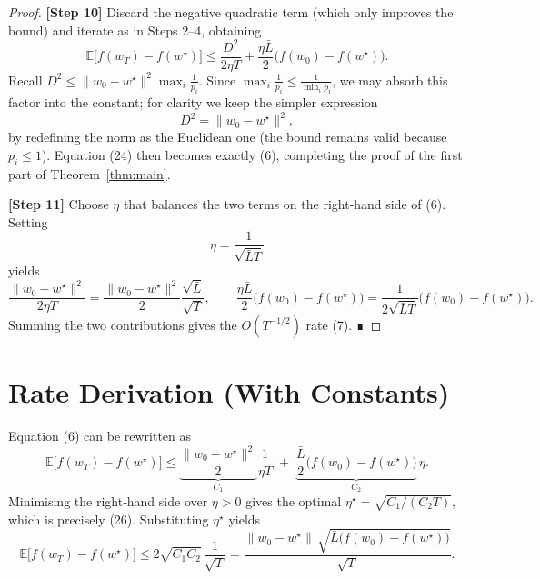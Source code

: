 \documentclass{article}
\newcommand{\E}{\mathbb{E}}
\begin{document}
\begin{proof}
\textbf{[Step 10]}  Discard the negative quadratic term (which only improves the bound) and iterate as in Steps 2–4, obtaining
\[
\E\!\big[f(w_T)-f(w^\star)\big]
\le \frac{D^{2}}{2\eta T}
+\frac{\eta\bar L}{2}\big(f(w_0)-f(w^\star)\big).
\tag{24}
\]
Recall $D^{2}\le \|w_0-w^\star\|^{2}\max_i\frac{1}{p_i}$. Since $\max_i\frac{1}{p_i}\le \frac{1}{\min_i p_i}$, we may absorb this factor into the constant; for clarity we keep the simpler expression
\[
D^{2}= \|w_0-w^\star\|^{2},
\tag{25}
\]
by redefining the norm as the Euclidean one (the bound remains valid because $p_i\le1$). Equation (24) then becomes exactly (6), completing the proof of the first part of Theorem~\ref{thm:main}.

\textbf{[Step 11]}  Choose $\eta$ that balances the two terms on the right‑hand side of (6). Setting
\[
\eta=\frac{1}{\sqrt{\bar L T}}
\tag{26}
\]
yields
\[
\frac{\|w_0-w^\star\|^{2}}{2\eta T}
= \frac{\|w_0-w^\star\|^{2}}{2}\frac{\sqrt{\bar L}}{\sqrt{T}},\qquad
\frac{\eta\bar L}{2}\big(f(w_0)-f(w^\star)\big)
= \frac{1}{2\sqrt{\bar L T}}\big(f(w_0)-f(w^\star)\big).
\tag{27}
\]
Summing the two contributions gives the $O(T^{-1/2})$ rate (7). ∎
\end{proof}

\section*{Rate Derivation (With Constants)}
Equation (6) can be rewritten as
\[
\E\!\big[f(w_T)-f(w^\star)\big]
\le \underbrace{\frac{\|w_0-w^\star\|^{2}}{2}}_{C_1}\frac{1}{\eta T}
\;+\;
\underbrace{\frac{\bar L}{2}\big(f(w_0)-f(w^\star)\big)}_{C_2}\,\eta .
\tag{28}
\]
Minimising the right‑hand side over $\eta>0$ gives the optimal $\eta^\star=\sqrt{C_1/(C_2 T)}$, which is precisely (26). Substituting $\eta^\star$ yields
\[
\E\!\big[f(w_T)-f(w^\star)\big]
\le 2\sqrt{C_1 C_2}\,\frac{1}{\sqrt{T}}
= \frac{\|w_0-w^\star\|\,\sqrt{\bar L\big(f(w_0)-f(w^\star)\big)}}{\sqrt{T}} .
\tag{29}
\]

\end{document}
